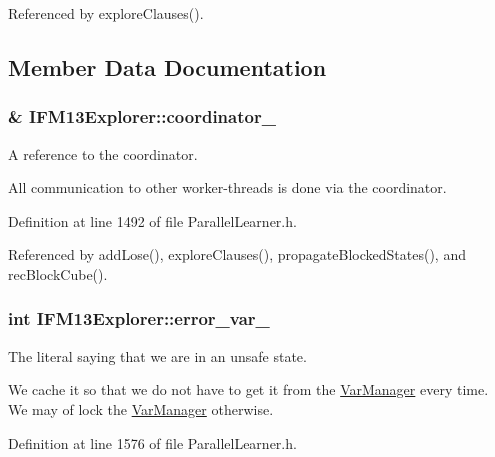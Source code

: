 Referenced by explore\-Clauses().



\subsection{Member Data Documentation}
\hypertarget{classIFM13Explorer_aff7fd95615eb7508a22b6b4992061678}{
\subsubsection[{coordinator\-\_\-}]{\& I\-F\-M13\-Explorer\-::coordinator\-\_\-\hspace{0.3cm}{\ttfamily [protected]}}}\label{classIFM13Explorer_aff7fd95615eb7508a22b6b4992061678}


A reference to the coordinator. 

All communication to other worker-\/threads is done via the coordinator. 

Definition at line 1492 of file Parallel\-Learner.\-h.



Referenced by add\-Lose(), explore\-Clauses(), propagate\-Blocked\-States(), and rec\-Block\-Cube().

\hypertarget{classIFM13Explorer_a222a8be4c6ce2e54488aabb9b882f8c9}{
\subsubsection[{error\-\_\-var\-\_\-}]{\setlength{\rightskip}{0pt plus 5cm}int I\-F\-M13\-Explorer\-::error\-\_\-var\-\_\-\hspace{0.3cm}{\ttfamily [protected]}}}\label{classIFM13Explorer_a222a8be4c6ce2e54488aabb9b882f8c9}


The literal saying that we are in an unsafe state. 

We cache it so that we do not have to get it from the \hyperlink{classVarManager}{Var\-Manager} every time. We may of lock the \hyperlink{classVarManager}{Var\-Manager} otherwise. 

Definition at line 1576 of file Parallel\-Learner.\-h.



